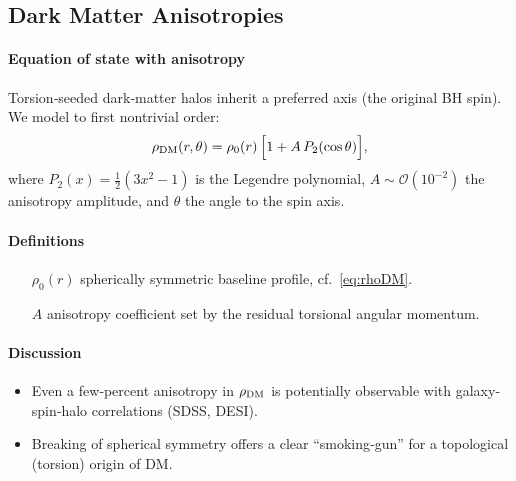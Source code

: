 \documentclass{article}
\begin{document}
\subsection{Dark Matter Anisotropies}
\label{sec:DM-anisotropy}
\paragraph{Equation of state with anisotropy}
Torsion‐seeded dark‐matter halos inherit a preferred axis (the original BH spin).  We model to first nontrivial order:
\[
  \rho_{\rm DM}(r,\theta)
    = \rho_0(r)\,\Bigl[1 + A\,P_2(\cos\theta)\Bigr],
\]
where $P_2(x)=\tfrac12(3x^2-1)$ is the Legendre polynomial, $A\sim\mathcal O(10^{-2})$ the anisotropy amplitude, and $\theta$ the angle to the spin axis.

\paragraph{Definitions}
\begin{itemize}[leftmargin=*]
  \item[$\rho_0(r)$] spherically symmetric baseline profile, cf.\ \eqref{eq:rhoDM}.
  \item[$A$] anisotropy coefficient set by the residual torsional angular momentum.
\end{itemize}

\paragraph{Discussion}
\begin{itemize}
  \item Even a few‐percent anisotropy in $\rho_{\rm DM}$ is potentially observable with galaxy‐spin‐halo correlations (SDSS, DESI).  
  \item Breaking of spherical symmetry offers a clear “smoking‐gun” for a topological (torsion) origin of DM.
\end{itemize}

\medskip
\begin{center}
\end{center}
\medskip
\end{document}
